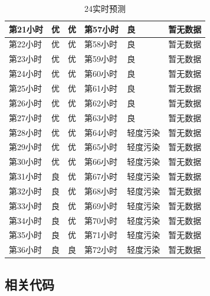 \documentclass[UTF8]{ctexart}
\begin{document}
\begin{table}[H]
\begin{tabular}{|l|l|l|l|l|l|}
        第21小时 & 优    & 优    & 第57小时 & 良    & 暂无数据 \\ \hline
        第22小时 & 优    & 优    & 第58小时 & 良    & 暂无数据 \\ \hline
        第23小时 & 优    & 优    & 第59小时 & 良    & 暂无数据 \\ \hline
        第24小时 & 优    & 优    & 第60小时 & 良    & 暂无数据 \\ \hline
        第25小时 & 优    & 优    & 第61小时 & 良    & 暂无数据 \\ \hline
        第26小时 & 优    & 优    & 第62小时 & 良    & 暂无数据 \\ \hline
        第27小时 & 优    & 优    & 第63小时 & 良    & 暂无数据 \\ \hline
        第28小时 & 优    & 优    & 第64小时 & 轻度污染 & 暂无数据 \\ \hline
        第29小时 & 优    & 优    & 第65小时 & 轻度污染 & 暂无数据 \\ \hline
        第30小时 & 优    & 优    & 第66小时 & 轻度污染 & 暂无数据 \\ \hline
        第31小时 & 良    & 优    & 第67小时 & 轻度污染 & 暂无数据 \\ \hline
        第32小时 & 良    & 优    & 第68小时 & 轻度污染 & 暂无数据 \\ \hline
        第33小时 & 良    & 优    & 第69小时 & 轻度污染 & 暂无数据 \\ \hline
        第34小时 & 良    & 优    & 第70小时 & 轻度污染 & 暂无数据 \\ \hline
        第35小时 & 良    & 优    & 第71小时 & 轻度污染 & 暂无数据 \\ \hline
        第36小时 & 良    & 良    & 第72小时 & 轻度污染 & 暂无数据 \\ \hline
        \end{tabular}
    \caption{24实时预测}
    \label{allhours72}
\end{table}

\subsection{相关代码}
\end{document}

